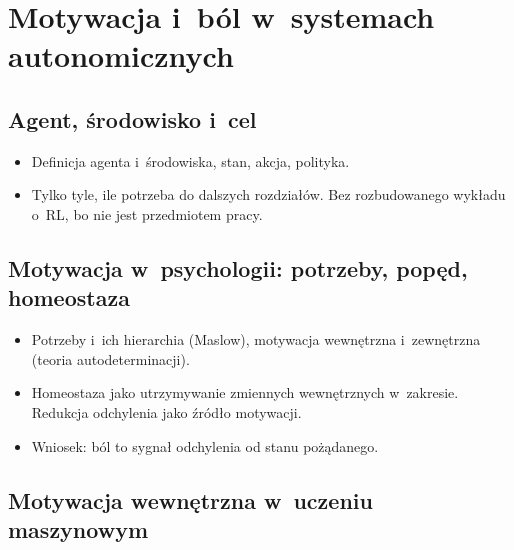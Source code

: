 
\chapter{Motywacja i~ból w~systemach autonomicznych}
\label{ch:motywacja}


\section{Agent, środowisko i~cel}
\label{sec:1-1}

\begin{planroboczy}[ok. 1 s.]
\begin{itemize}
  \item Definicja agenta i~środowiska, stan, akcja, polityka.
  \item Tylko tyle, ile potrzeba do dalszych rozdziałów. Bez rozbudowanego wykładu o~RL, bo nie jest przedmiotem pracy.
\end{itemize}

\end{planroboczy}

\section{Motywacja w~psychologii: potrzeby, popęd, homeostaza}
\label{sec:1-2}

\begin{planroboczy}[ok. 1,5 s.]
\begin{itemize}
  \item Potrzeby i~ich hierarchia (Maslow), motywacja wewnętrzna i~zewnętrzna (teoria autodeterminacji).
  \item Homeostaza jako utrzymywanie zmiennych wewnętrznych w~zakresie. Redukcja odchylenia jako źródło motywacji.
  \item Wniosek: ból to sygnał odchylenia od stanu pożądanego.
\end{itemize}

\end{planroboczy}

\section{Motywacja wewnętrzna w~uczeniu maszynowym}
\label{sec:1-3}

